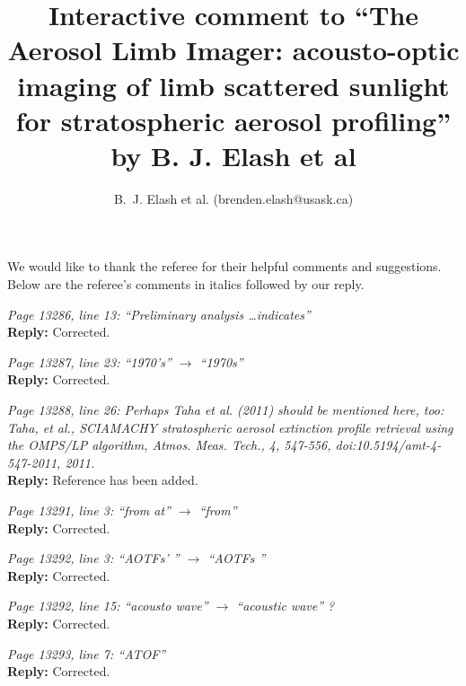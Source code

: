 \documentclass[12pt, notitlepage]{article}
\title{Interactive comment to ``The Aerosol Limb Imager: acousto-optic imaging of limb scattered
sunlight for stratospheric aerosol profiling'' by B. J. Elash et al}
\author{B.~J. Elash et al. (brenden.elash@usask.ca)}
\begin{document}
\begin{titlepage}
\maketitle
\end{titlepage}


We would like to thank the referee for their helpful comments and suggestions. Below are the referee's comments in italics followed by our reply.

\hrulefill

\textit{Page 13286, line 13: ``Preliminary analysis \ldots indicates''}\\

\textbf{Reply:} Corrected.

\hrulefill

\textit{Page 13287, line 23: ``1970's'' $\rightarrow$ ``1970s''}\\

\textbf{Reply:} Corrected.

\hrulefill

\textit{Page 13288, line 26: Perhaps Taha et al. (2011) should be mentioned here, too: Taha, et al., SCIAMACHY stratospheric aerosol extinction profile retrieval using the OMPS/LP algorithm, Atmos. Meas. Tech., 4, 547-556, doi:10.5194/amt-4-547-2011, 2011.}\\

\textbf{Reply:} Reference has been added.

\hrulefill

\textit{Page 13291, line 3: ``from at'' $\rightarrow$ ``from''}\\

\textbf{Reply:} Corrected.

\hrulefill

\textit{Page 13292, line 3: ``AOTFs' '' $\rightarrow$ ``AOTFs ''}\\

\textbf{Reply:} Corrected.

\hrulefill

\textit{Page 13292, line 15: ``acousto wave'' $\rightarrow$ ``acoustic wave'' ?}\\

\textbf{Reply:} Corrected.

\hrulefill

\textit{Page 13293, line 7: ``ATOF''}\\

\textbf{Reply:} Corrected.

\hrulefill
\end{document}
